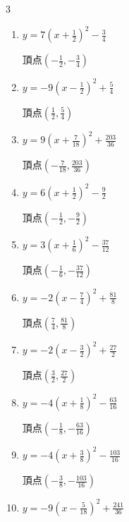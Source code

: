 \begin{multicols}{3}
\begin{enumerate}
\columnbreak %

\resetques

  \item $\displaystyle y=7\left( x+\frac{1}{2}\right)^{2}-\frac{3}{4}$

        $\displaystyle 頂点\left( -\frac{1}{2} , -\frac{3}{4} \right)$

  \item $\displaystyle y=-9\left( x-\frac{1}{2}\right)^{2}+\frac{5}{4}$

        $\displaystyle 頂点\left( \frac{1}{2} , \frac{5}{4} \right)$

  \item $\displaystyle y=9\left( x+\frac{7}{18}\right)^{2}+\frac{203}{36}$

        $\displaystyle 頂点\left( -\frac{7}{18} , \frac{203}{36} \right)$

  \item $\displaystyle y=6\left( x+\frac{1}{2}\right)^{2}-\frac{9}{2}$

        $\displaystyle 頂点\left( -\frac{1}{2} , -\frac{9}{2} \right)$

  \item $\displaystyle y=3\left( x+\frac{1}{6}\right)^{2}-\frac{37}{12}$

        $\displaystyle 頂点\left( -\frac{1}{6} , -\frac{37}{12} \right)$

  \item $\displaystyle y=-2\left( x-\frac{7}{4}\right)^{2}+\frac{81}{8}$

        $\displaystyle 頂点\left( \frac{7}{4} , \frac{81}{8} \right)$

  \item $\displaystyle y=-2\left( x-\frac{3}{2}\right)^{2}+\frac{27}{2}$

        $\displaystyle 頂点\left( \frac{3}{2} , \frac{27}{2} \right)$

  \item $\displaystyle y=-4\left( x+\frac{1}{8}\right)^{2}-\frac{63}{16}$

        $\displaystyle 頂点\left( -\frac{1}{8} , -\frac{63}{16} \right)$

  \item $\displaystyle y=-4\left( x+\frac{3}{8}\right)^{2}-\frac{103}{16}$

        $\displaystyle 頂点\left( -\frac{3}{8} , -\frac{103}{16} \right)$

  \item $\displaystyle y=-9\left( x-\frac{5}{18}\right)^{2}+\frac{241}{36}$


\end{enumerate}
\end{multicols}
